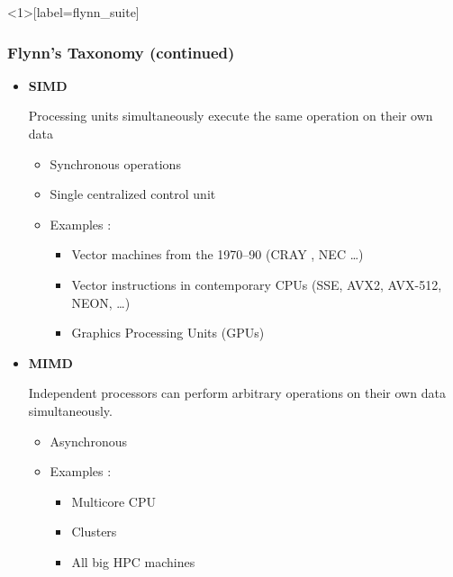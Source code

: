 \documentclass[xcolor={x11names,svgnames,psnames}]{beamer}
\begin{document}
\begin{frame}<1>[label=flynn_suite]
\frametitle{Flynn's Taxonomy (continued)}

\begin{itemize}
  
\item {\bf SIMD} 

Processing units simultaneously execute the same operation on their own data
\begin{itemize}
\item Synchronous operations
\item Single centralized control unit
\item Examples :
  \begin{itemize}
  \item Vector machines from the 1970--90 (CRAY , NEC \dots)
  \item Vector instructions in contemporary CPUs (SSE, AVX2, AVX-512, NEON, \dots)
  \item Graphics Processing Units (GPUs)
  \end{itemize}
\end{itemize}


\item<2-> {\bf MIMD} 

  Independent processors can perform arbitrary operations on their own data
  simultaneously.
\begin{itemize}
\item Asynchronous 
\item Examples :
  \begin{itemize}
  \item Multicore CPU
  \item Clusters
  \item All big HPC machines
  \end{itemize}
\end{itemize}

\end{itemize}
\end{frame}

\end{document}
